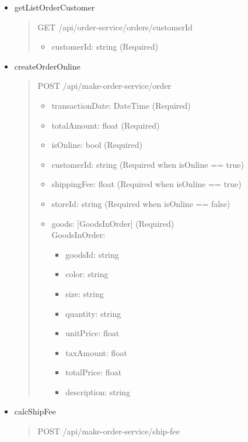 \begin{itemize}
	\item getListOrderCustomer
	      \begin{quote}
		      GET /api/order-service/orders/{customerId}
		      \begin{itemize}
			      \item customerId: string (Required)
		      \end{itemize}
	      \end{quote}

	\item createOrderOnline
	      \begin{quote}
		      POST /api/make-order-service/order
		      \begin{itemize}
			      \item transactionDate: DateTime (Required)
			      \item totalAmount: float (Required)
			      \item isOnline: bool (Required)
			      \item customerId: string (Required when isOnline == true)
			      \item shippingFee: float (Required when isOnline == true)
			      \item storeId: string (Required when isOnline == false)
			      \item goods: [GoodsInOrder] (Required)\\
			            GoodsInOrder:
			            \begin{itemize}
				            \item goodsId: string
				            \item color: string
				            \item size: string
				            \item quantity: string
				            \item unitPrice: float
				            \item taxAmount: float
				            \item totalPrice: float
				            \item description: string
			            \end{itemize}
		      \end{itemize}
	      \end{quote}
	\item calcShipFee
	      \begin{quote}
		      POST /api/make-order-service/ship-fee

\end{quote}
\end{itemize}
